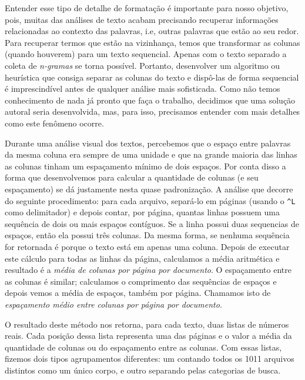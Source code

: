 \documentclass[10pt, a4paper]{article}
\begin{document}
Entender esse tipo de detalhe de formatação é importante para nosso objetivo, pois, muitas das análises de texto acabam precisando recuperar informações relacionadas ao contexto das palavras, i.e, outras palavras que estão ao seu redor. Para recuperar termos que estão na vizinhança, temos que transformar as colunas (quando houverem) para um texto sequencial. Apenas com o texto separado a coleta de \textit{n-gramas} se torna possível. Portanto, desenvolver um algoritmo ou heurística que consiga separar as colunas do texto e dispô-las de forma sequencial é imprescindível antes de qualquer análise mais sofisticada. Como não temos conhecimento de nada já pronto que faça o trabalho, decidimos que uma solução autoral seria desenvolvida, mas, para isso, precisamos entender com mais detalhes como este fenômeno ocorre.

Durante uma análise visual dos textos, percebemos que o espaço entre palavras da mesma coluna era sempre de uma unidade e que na grande maioria das linhas as colunas tinham um espaçamento mínimo de dois espaços. Por conta disso a forma que desenvolvemos para calcular a quantidade de colunas (e seu espaçamento) se dá justamente nesta quase padronização. A análise que decorre do seguinte procedimento: para cada arquivo, separá-lo em páginas (usando o \texttt{\textasciicircum L} como delimitador) e depois contar, por página, quantas linhas possuem uma sequência de dois ou mais espaços contíguos. Se a linha possui duas sequencias de espaços, então ela possui três colunas. Da mesma forma, se nenhuma sequência for retornada é porque o texto está em apenas uma coluna. Depois de executar este cálculo para todas as linhas da página, calculamos a média aritmética e resultado é a \emph{média de colunas por página por documento}. O espaçamento entre as colunas é similar; calculamos o comprimento das sequências de espaços e depois vemos a média de espaços, também por página. Chamamos isto de \emph{espaçamento médio entre colunas por página por documento}.

O resultado deste método nos retorna, para cada texto, duas listas de números reais. Cada posição dessa lista representa uma das páginas e o valor a média da quantidade de colunas ou do espaçamento entre as colunas. Com essas listas, fizemos dois tipos agrupamentos diferentes: um contando todos os 1011 arquivos distintos como um único corpo, e outro separando pelas categorias de busca. 
\end{document}
